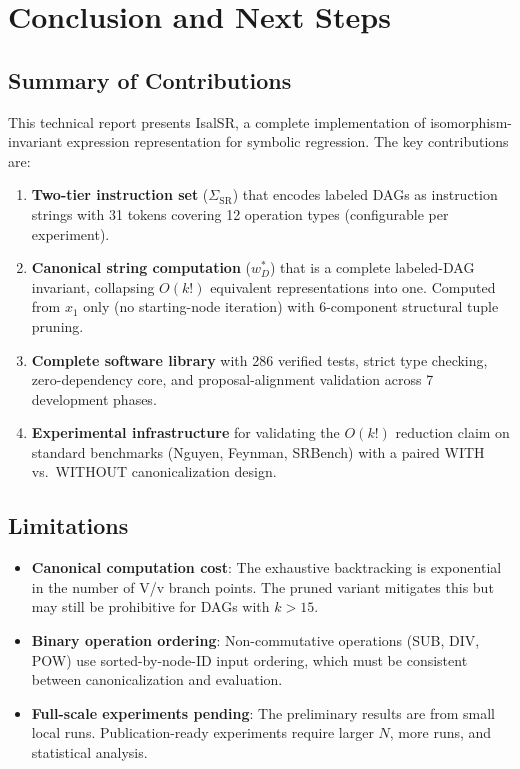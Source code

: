 \section{Conclusion and Next Steps}
\label{sec:conclusion}

\subsection{Summary of Contributions}

This technical report presents IsalSR, a complete implementation of
isomorphism-invariant expression representation for symbolic regression.
The key contributions are:

\begin{enumerate}
  \item \textbf{Two-tier instruction set} ($\Sigma_{\mathrm{SR}}$) that
    encodes labeled DAGs as instruction strings with 31 tokens covering
    12 operation types (configurable per experiment).

  \item \textbf{Canonical string computation} ($w^*_D$) that is a complete
    labeled-DAG invariant, collapsing $O(k!)$ equivalent representations
    into one. Computed from $x_1$ only (no starting-node iteration) with
    6-component structural tuple pruning.

  \item \textbf{Complete software library} with 286 verified tests, strict
    type checking, zero-dependency core, and proposal-alignment validation
    across 7 development phases.

  \item \textbf{Experimental infrastructure} for validating the $O(k!)$
    reduction claim on standard benchmarks (Nguyen, Feynman, SRBench)
    with a paired WITH vs.\ WITHOUT canonicalization design.
\end{enumerate}

\subsection{Limitations}

\begin{itemize}[nosep]
  \item \textbf{Canonical computation cost}: The exhaustive backtracking is
    exponential in the number of V/v branch points. The pruned variant
    mitigates this but may still be prohibitive for DAGs with $k > 15$.
  \item \textbf{Binary operation ordering}: Non-commutative operations
    (SUB, DIV, POW) use sorted-by-node-ID input ordering, which must be
    consistent between canonicalization and evaluation.
  \item \textbf{Full-scale experiments pending}: The preliminary results
    are from small local runs. Publication-ready experiments require
    larger $N$, more runs, and statistical analysis.
\end{itemize}

